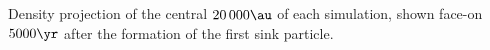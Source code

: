 \label{fig:disks} 
Density projection of the central $20\,000\au$ of each simulation, shown face-on $5000\yr$ after the formation of the first sink particle.
